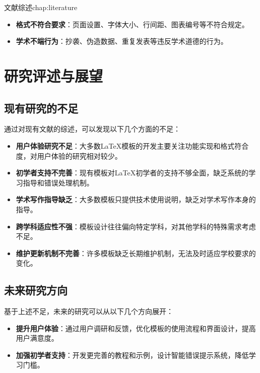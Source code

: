 \begin{cuzchapter}{文献综述}{chap:literature}
\begin{itemize}
		\item \textbf{格式不符合要求}：页面设置、字体大小、行间距、图表编号等不符合规定。
		
		\item \textbf{学术不端行为}：抄袭、伪造数据、重复发表等违反学术道德的行为。
	\end{itemize}
	
	\section{研究评述与展望}\label{sec:review-prospect}
	
	\subsection{现有研究的不足}
	
	通过对现有文献的综述，可以发现以下几个方面的不足：
	
	\begin{itemize}
		\item \textbf{用户体验研究不足}：大多数\LaTeX{}模板的开发主要关注功能实现和格式符合度，对用户体验的研究相对较少。
		
		\item \textbf{初学者支持不完善}：现有模板对\LaTeX{}初学者的支持不够全面，缺乏系统的学习指导和错误处理机制。
		
		\item \textbf{学术写作指导缺乏}：大多数模板只提供技术使用说明，缺乏对学术写作本身的指导。
		
		\item \textbf{跨学科适应性不强}：模板设计往往偏向特定学科，对其他学科的特殊需求考虑不足。
		
		\item \textbf{维护更新机制不完善}：许多模板缺乏长期维护机制，无法及时适应学校要求的变化。
	\end{itemize}
	
	\subsection{未来研究方向}
	
	基于上述不足，未来的研究可以从以下几个方向展开：
	
	\begin{itemize}
		\item \textbf{提升用户体验}：通过用户调研和反馈，优化模板的使用流程和界面设计，提高用户满意度。
		
		\item \textbf{加强初学者支持}：开发更完善的教程和示例，设计智能错误提示系统，降低学习门槛。
		

\end{itemize}
\end{cuzchapter}
